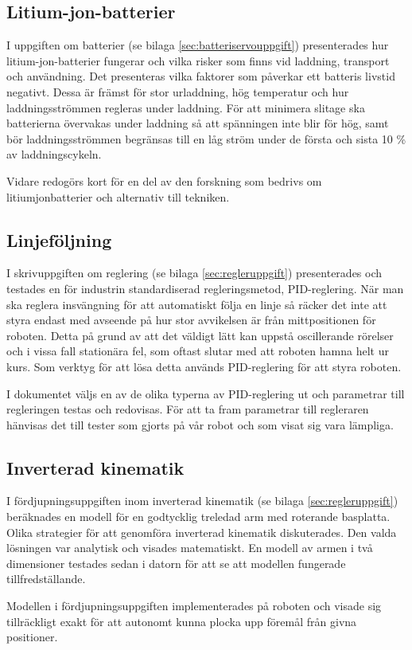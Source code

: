 \subsection{Litium-jon-batterier}

I uppgiften om batterier (se bilaga \ref{sec:batteriservouppgift}) presenterades hur litium-jon-batterier fungerar och vilka risker som finns vid laddning, transport och användning. Det presenteras vilka faktorer som påverkar ett batteris livstid negativt. Dessa är främst för stor urladdning, hög temperatur och hur laddningsströmmen regleras under laddning. För att minimera slitage ska batterierna övervakas under laddning så att spänningen inte blir för hög, samt bör laddningsströmmen begränsas till en låg ström under de första och sista 10 \% av laddningscykeln.

Vidare redogörs kort för en del av den forskning som bedrivs om litiumjonbatterier och alternativ till tekniken.

\subsection{Linjeföljning}

I skrivuppgiften om reglering (se bilaga \ref{sec:regleruppgift}) presenterades och testades en för industrin standardiserad regleringsmetod, PID-reglering. När man ska reglera insvängning för att automatiskt följa en linje så räcker det inte att styra endast med avseende på hur stor avvikelsen är från mittpositionen för roboten. Detta på grund av att det väldigt lätt kan uppstå oscillerande rörelser och i vissa fall stationära fel, som oftast slutar med att roboten hamna helt ur kurs. Som verktyg för att lösa detta används PID-reglering för att styra roboten.

I dokumentet väljs en av de olika typerna av PID-reglering ut och parametrar till regleringen testas och redovisas. För att ta fram parametrar till regleraren hänvisas det till tester som gjorts på vår robot och som visat sig vara lämpliga.

\subsection{Inverterad kinematik}
I fördjupningsuppgiften inom inverterad kinematik (se bilaga \ref{sec:regleruppgift}) beräknades en modell för en godtycklig treledad arm med roterande basplatta. Olika strategier för att genomföra inverterad kinematik diskuterades. Den valda lösningen var analytisk och visades matematiskt. En modell av armen i två dimensioner testades sedan i datorn för att se att modellen fungerade tillfredställande.

Modellen i fördjupningsuppgiften implementerades på roboten och visade sig tillräckligt exakt för att autonomt kunna plocka upp föremål från givna positioner.